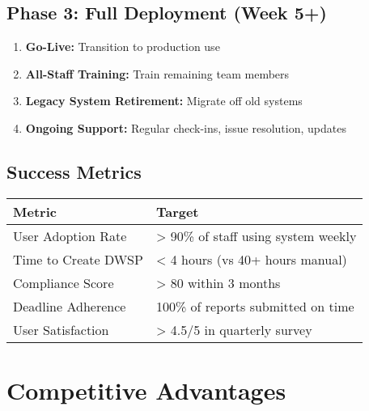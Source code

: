 \documentclass[11pt,a4paper]{article}
\begin{document}
\subsection{Phase 3: Full Deployment (Week 5+)}

\begin{enumerate}[leftmargin=*, itemsep=0.3em]
    \item \textbf{Go-Live:} Transition to production use
    \item \textbf{All-Staff Training:} Train remaining team members
    \item \textbf{Legacy System Retirement:} Migrate off old systems
    \item \textbf{Ongoing Support:} Regular check-ins, issue resolution, updates
\end{enumerate}

\subsection{Success Metrics}

\begin{table}[H]
\centering
\begin{tabular}{p{5cm}p{9cm}}
\toprule
\textbf{Metric} & \textbf{Target} \\
\midrule
User Adoption Rate & > 90\% of staff using system weekly \\
Time to Create DWSP & < 4 hours (vs 40+ hours manual) \\
Compliance Score & > 80 within 3 months \\
Deadline Adherence & 100\% of reports submitted on time \\
User Satisfaction & > 4.5/5 in quarterly survey \\
\bottomrule
\end{tabular}
\end{table}

\newpage

\section{Competitive Advantages}
\end{document}
